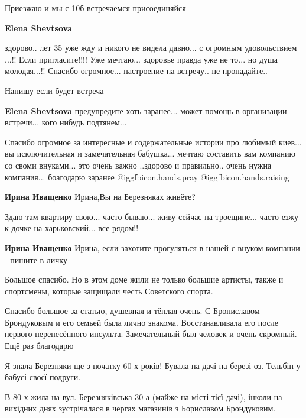 \begin{itemize}
\begin{itemize} %
Приезжаю и мы с 10б встречаемся присоединяйся

\textbf{Elena Shevtsova} 

здорово.. лет 35 уже жду и никого не видела давно... с огромным удовольствием
...!! Если пригласите!!!! Уже мечтаю... здоровье правда уже не то... но душа
молодая...!! Спасибо огромное... настроение на встречу.. не пропадайте..


Напишу если будет встреча

\textbf{Elena Shevtsova} предупредите хоть заранее... может помощь в организации встречи... кого нибудь подтянем...
\end{itemize} %


Спасибо огромное за интересные и содержательные истории про любимый киев... вы
исключительная и замечательная бабушка... мечтаю составить вам компанию со своми
внуками... это очень важно ..здорово и правильно.. очень нужна
компания... боагодарю заранее @igg{fbicon.hands.pray}  @igg{fbicon.hands.raising} 

\begin{itemize} %
\textbf{Ирина Иващенко} Ирина,Вы на Березняках живёте?

Здаю там квартиру свою... часто бываю... живу сейчас на троещине... часто езжу
к дочке на харьковский... все рядом!!


\textbf{Ирина Иващенко} Ирина, если захотите прогуляться в нашей с внуком компании - пишите в личку
\end{itemize} %


Большое спасибо. Но в этом доме жили не только большие артисты, также и
спортсмены, которые защищали честь Советского спорта.

Спасибо большое за статью, душевная и тёплая очень. С Брониславом Брондуковым
и его семьей была лично знакома. Восстанавливала его после первого
перенесённого инсульта. Замечательный был человек и очень скромный. Ещё раз
благодарю



Я знала Березняки ще з початку 60-х років! Бувала на дачі на березі оз. Тельбін
у бабусі своєї подруги.

В 80-х жила на вул. Березняківська 30-а (майже на місті тієї дачі), інколи на
вихідних днях зустрічалася в чергах магазинів з Бориславом Брондуковим.


\end{itemize}
